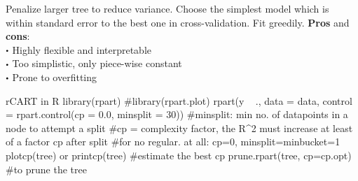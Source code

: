 Penalize larger tree to reduce variance. Choose the simplest model which is within standard error to the best one in cross-validation.
Fit greedily. \textbf{Pros} and \textbf{cons}:\\
$\bigcdot$ Highly flexible and interpretable\\
$\bigcdot$ Too simplistic, only piece-wise constant\\
$\bigcdot$ Prone to overfitting 
\begin{codebox}{r}{CART in R}
library(rpart) #library(rpart.plot)
rpart(y ~ ., data = data, control = rpart.control(cp = 0.0, minsplit = 30)) #minsplit: min no. of datapoints in a node to attempt a split
#cp = complexity factor, the R^2 must increase at least of a factor cp after split 
#for no regular. at all: cp=0, minsplit=minbucket=1
plotcp(tree) or printcp(tree) #estimate the best cp
prune.rpart(tree, cp=cp.opt) #to prune the tree
\end{codebox}